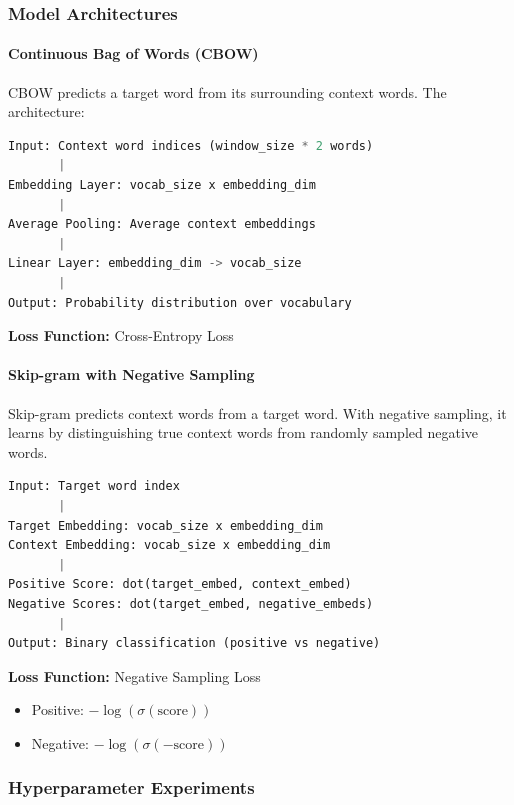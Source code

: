 \documentclass[12pt,a4paper]{article}
\begin{document}
\subsubsection{Model Architectures}

\paragraph{Continuous Bag of Words (CBOW)}

CBOW predicts a target word from its surrounding context words. The architecture:

\begin{lstlisting}[language=Python, caption=CBOW Architecture]
Input: Context word indices (window_size * 2 words)
       |
Embedding Layer: vocab_size x embedding_dim
       |
Average Pooling: Average context embeddings
       |
Linear Layer: embedding_dim -> vocab_size
       |
Output: Probability distribution over vocabulary
\end{lstlisting}

\textbf{Loss Function:} Cross-Entropy Loss

\paragraph{Skip-gram with Negative Sampling}

Skip-gram predicts context words from a target word. With negative sampling, it learns by distinguishing true context words from randomly sampled negative words.

\begin{lstlisting}[language=Python, caption=Skip-gram Architecture]
Input: Target word index
       |
Target Embedding: vocab_size x embedding_dim
Context Embedding: vocab_size x embedding_dim
       |
Positive Score: dot(target_embed, context_embed)
Negative Scores: dot(target_embed, negative_embeds)
       |
Output: Binary classification (positive vs negative)
\end{lstlisting}

\textbf{Loss Function:} Negative Sampling Loss
\begin{itemize}
    \item Positive: $-\log(\sigma(\text{score}))$
    \item Negative: $-\log(\sigma(-\text{score}))$
\end{itemize}

\subsubsection{Hyperparameter Experiments}
\end{document}

